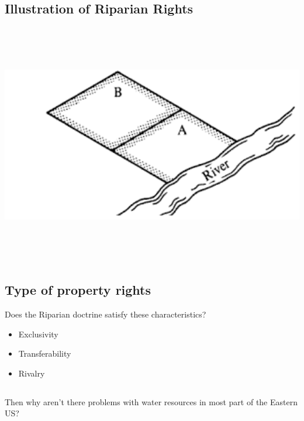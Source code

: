 \documentclass[]{article}
\providecommand{\tightlist}{%
  \setlength{\itemsep}{0pt}\setlength{\parskip}{0pt}}
\begin{document}
\hypertarget{illustration-of-riparian-rights}{%
\subsection{Illustration of Riparian
Rights}\label{illustration-of-riparian-rights}}

\includegraphics[width=\textwidth,height=4.16667in]{figures/m10_riparian.png}

\hypertarget{type-of-property-rights}{%
\subsection{Type of property rights}\label{type-of-property-rights}}

Does the Riparian doctrine satisfy these characteristics?

\begin{itemize}
\tightlist
\item
  Exclusivity
\item
  Transferability
\item
  Rivalry
\end{itemize}

\hypertarget{section-31}{%
\subsection{}\label{section-31}}

Then why aren't there problems with water resources in most part of the
Eastern US?

\hypertarget{section-32}{%
\subsection{}\label{section-32}}
\end{document}
